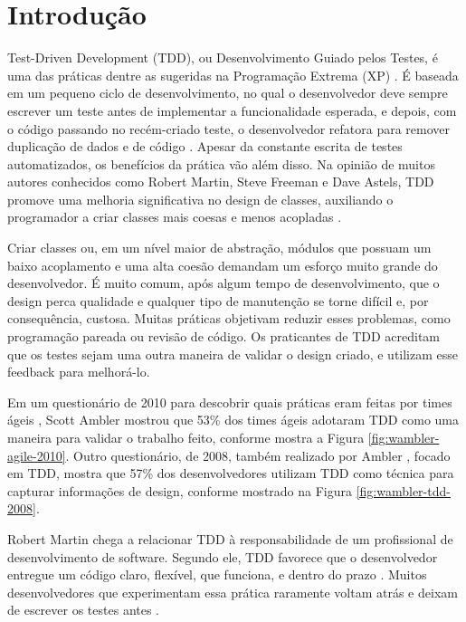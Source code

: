 \chapter{Introdução}
\label{cap:introducao}

Test-Driven Development (TDD), ou Desenvolvimento Guiado pelos Testes,
é uma das práticas dentre as sugeridas na Programação
Extrema (XP) \cite{XPExplained}. É baseada em um pequeno ciclo de
desenvolvimento, no qual o desenvolvedor deve sempre escrever um teste antes
de implementar a funcionalidade esperada, e depois, com o código
passando no recém-criado teste, o desenvolvedor refatora para 
remover duplicação de dados e de código \cite{TDDByExample}.
Apesar da constante escrita de testes automatizados, os benefícios da
prática vão além disso. Na opinião de muitos autores conhecidos como Robert Martin,
Steve Freeman e Dave Astels, TDD promove
uma melhoria significativa no design de classes, auxiliando o programador a
criar classes mais coesas e menos acopladas \cite{TDDByExample} \cite{GOOS} 
\cite{astels-tdd}.

Criar classes ou, em um nível maior de abstração, módulos que possuam um baixo
acoplamento e uma alta coesão demandam um esforço muito grande do desenvolvedor. 
É muito comum, após algum tempo de desenvolvimento, que o design perca qualidade
e qualquer tipo de manutenção se torne difícil e, por consequência, custosa.
Muitas práticas objetivam reduzir esses problemas, como programação pareada ou
revisão de código. Os praticantes de TDD acreditam que os testes sejam uma outra
maneira de validar o design criado, e utilizam esse feedback para melhorá-lo.

Em um questionário de 2010 para descobrir quais práticas eram feitas por times
ágeis \cite{wambler-survey-agile}, Scott Ambler mostrou que 53\% dos times ágeis
adotaram TDD como uma maneira para validar o trabalho feito, conforme mostra a 
Figura \ref{fig:wambler-agile-2010}. Outro questionário, de 2008, também realizado por Ambler
\cite{wambler-survey-tdd}, focado em TDD, mostra que 57\% dos desenvolvedores 
utilizam TDD como técnica para capturar informações de design, conforme mostrado
na Figura \ref{fig:wambler-tdd-2008}.

Robert Martin chega a relacionar TDD à responsabilidade de um 
profissional de desenvolvimento de software. 
Segundo ele, TDD favorece que o desenvolvedor entregue um 
código claro, flexível, que funciona, e dentro do prazo \cite{martin-profissionalismo}.
Muitos desenvolvedores que experimentam essa prática raramente voltam atrás e deixam
de escrever os testes antes \cite{tdd-fearless}. 


